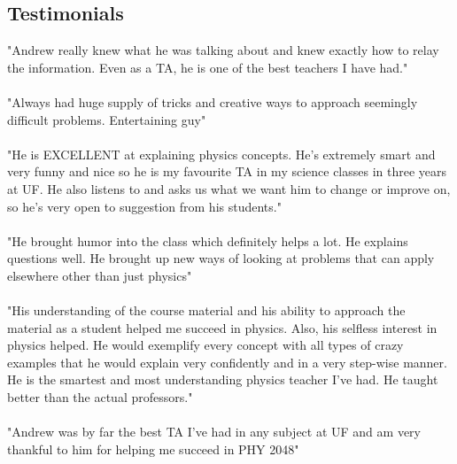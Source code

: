 \begin{resume}
    \section{\mysidestyle Testimonials}
              "Andrew really knew what he was talking about and knew exactly how to relay the information. Even as a TA, he is one of the best teachers I have had."
             \\ \\ "Always had huge supply of tricks and creative ways to approach seemingly difficult problems. Entertaining guy"
             \\ \\ "He is EXCELLENT at explaining physics concepts. He's extremely smart and very funny and nice so he is my favourite TA in my science classes in three years at UF. He also listens to and asks us what we want him to change or improve on, so he's very open to suggestion from his students."
             \\ \\ "He brought humor into the class which definitely helps a lot. He explains questions well. He brought up new ways of looking at problems that can apply elsewhere other than just physics"
             \\ \\ "His understanding of the course material and his ability to approach the material as a student helped me succeed in physics. Also, his selfless interest in physics helped. He would exemplify every concept with all types of crazy examples that he would explain very confidently and in a very step-wise manner. He is the smartest and most understanding physics teacher I've had. He taught better than the actual professors."
             \\ \\ "Andrew was by far the best TA I've had in any subject at UF and am very thankful to him for helping me succeed in PHY 2048"
\end{resume}


